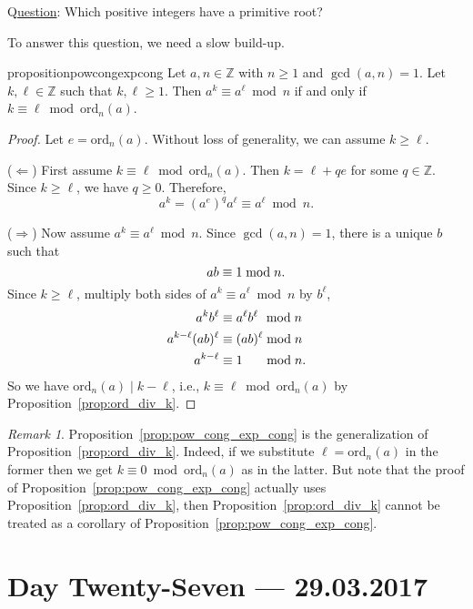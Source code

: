 \documentclass{amsbook}
\theoremstyle{plain}
\theoremstyle{definition}
\theoremstyle{remark}
\newtheorem{remark}[theorem]{Remark}
\numberwithin{equation}{chapter}
\numberwithin{figure}{chapter}
\newcommand{\Z}{\mathbb{Z}}
\newcommand*{\ord}{\text{ord}}
\begin{document}
Q\underline{uestion}: Which positive integers have a primitive root?

To answer this question, we need a slow build-up.

\begin{restatable}{proposition}{powcongexpcong}\label{prop:pow_cong_exp_cong}
  Let $a, n \in \Z$ with $n \geqslant 1$ and $\gcd (a, n) = 1$. Let $k, \ell \in \Z$ such that $k, \ell \geqslant 1$. Then $a^k \equiv a^{\ell} \bmod n$ if and only if $k \equiv \ell \bmod \ord_n (a)$.
\end{restatable}
\begin{proof}
  Let $e = \ord_n (a)$. Without loss of generality, we can assume $k \geqslant \ell$.

($\Leftarrow$) First assume $k \equiv \ell \bmod \ord_n (a)$. Then $k = \ell + qe$ for some $q \in \Z$. Since $k \geqslant \ell$, we have $q \geqslant 0$. Therefore, 
\[
a^k = (a^e)^q a^{\ell} \equiv a^{\ell} \bmod n.
\]

($\Rightarrow$) Now assume $a^k \equiv a^{\ell} \bmod n$. Since $\gcd (a, n) = 1$, there is a unique $b$ such that 
\[
\hspace{5.5mm}ab \equiv 1 \bmod n.
\]
Since $k \geqslant \ell$, multiply both sides of $a^k \equiv a^{\ell} \bmod n$ by $b^{\ell}$,
\begin{align}
  a^k b^{\ell} &\equiv a^{\ell} b^{\ell} \hspace{1.3mm}\bmod n \\
  a^{k-\ell} (ab)^{\ell} &\equiv (ab)^{\ell} \bmod n \\
  a^{k-\ell} &\equiv 1 \hspace{5.7mm}\bmod n.
\end{align}
So we have $\ord_n (a) \mid k - \ell$, i.e., $k \equiv \ell \bmod \ord_n (a)$ by Proposition~\ref{prop:ord_div_k}.
\end{proof}
\begin{remark}
  Proposition~\ref{prop:pow_cong_exp_cong} is the generalization of Proposition~\ref{prop:ord_div_k}. Indeed, if we substitute $\ell = \ord_n (a)$ in the former then we get $k \equiv 0 \bmod \ord_n (a)$ as in the latter. But note that the proof of Proposition~\ref{prop:pow_cong_exp_cong} actually uses Proposition~\ref{prop:ord_div_k}, then Proposition~\ref{prop:ord_div_k} cannot be treated as a corollary of Proposition~\ref{prop:pow_cong_exp_cong}.
\end{remark}

\chapter[Lecture Twenty-Seven]{Day Twenty-Seven \hfill {\footnotesize \rm --- 29.03.2017}}
\end{document}
